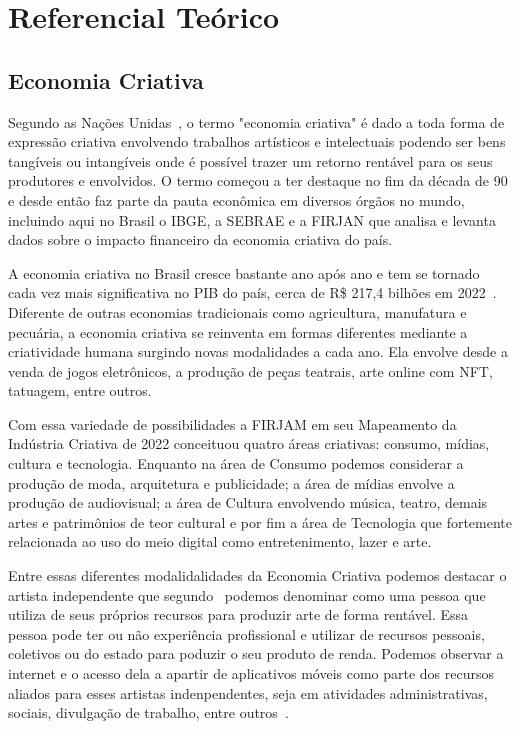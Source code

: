 \chapter{Referencial Teórico}\label{ch:referencial-teorico}

\section{Economia Criativa}\label{sec:economia-criativa}

Segundo as Nações Unidas~\cite{sebrae}, o termo "economia criativa" é dado a toda forma de expressão criativa envolvendo trabalhos artísticos e intelectuais podendo ser bens tangíveis ou intangíveis onde é possível trazer um retorno rentável para os seus produtores e envolvidos.
O termo começou a ter destaque no fim da década de 90 e desde então faz parte da pauta econômica em diversos órgãos no mundo, incluindo aqui no Brasil o IBGE, a  SEBRAE e a FIRJAN que analisa e levanta dados sobre o impacto financeiro da economia criativa do país.

A economia criativa no Brasil cresce bastante ano após ano e tem se tornado cada vez mais significativa no PIB do país, cerca de R\$ 217,4 bilhões em 2022~\cite{firjam}.
Diferente de outras economias tradicionais como agricultura, manufatura e pecuária, a economia criativa se reinventa em formas diferentes mediante a criatividade humana surgindo novas modalidades a cada ano.
Ela envolve desde a venda de jogos eletrônicos, a produção de peças teatrais, arte online com NFT, tatuagem, entre outros.

Com essa variedade de possibilidades a FIRJAM em seu Mapeamento da Indústria Criativa de 2022 conceituou quatro áreas criativas: consumo, mídias, cultura e tecnologia.
Enquanto na área de Consumo podemos considerar a produção de moda, arquitetura e publicidade; a área de mídias envolve a produção de audiovisual; a área de Cultura envolvendo música, teatro, demais artes e patrimônios de teor cultural e por fim a área de Tecnologia que fortemente relacionada ao uso do meio digital como entretenimento, lazer e arte.

Entre essas diferentes modalidalidades da Economia Criativa podemos destacar o artista independente que segundo~\cite{artista} podemos denominar como uma pessoa que utiliza de seus próprios recursos para produzir arte de forma rentável. 
Essa pessoa pode ter ou não experiência profissional e utilizar de recursos pessoais, coletivos ou do estado para poduzir o seu produto de renda.
Podemos observar a internet e o acesso dela a apartir de aplicativos móveis como parte dos recursos aliados para esses artistas indenpendentes, seja em atividades administrativas, sociais, divulgação de trabalho, entre outros~\cite{bittencourt}.

